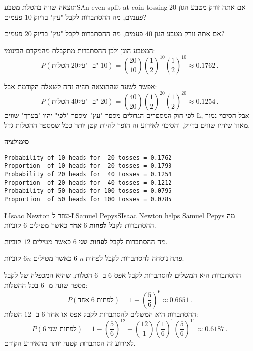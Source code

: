 
\begin{prob}{תוצאה שווה בהטלת מטבע}{S}{An even split at coin tossing}
אם אתה זורק מטבע הגון 
$20$
פעמים, מה ההסתברות לקבל "עץ" בדיוק 
$10$
פעמים?

אם אתה זורק מטבע הגון 
$40$
פעמים, מה ההסתברות לקבל "עץ" בדיוק 
$20$
פעמים?
\end{prob}

\solution{}

המטבע הוגן ולכן ההסתברות מתקבלת מהמקדם הבינומי:
\[
P(\textrm{הטלות}\; 20\textrm{ב- "עץ"}\;10)=
{20 \choose 10} \left(\frac{1}{2}\right)^{10}\left(\frac{1}{2}\right)^{10}\approx 0.1762\,.
\]

אפשר לשער שהתוצאה תהיה זהה לשאלה הקודמת אבל:
\[
P(\textrm{הטלות}\;40\textrm{ב- "עץ"}\;20)=
{40 \choose 20} \left(\frac{1}{2}\right)^{20}\left(\frac{1}{2}\right)^{20}\approx 0.1254\,.
\]
לפי חוק המספרים הגדולים מספר "עץ" ומספר "לפי" יהיו "בערך" שווים
\L{\cite[Section~8.4]{ross}},
אבל הסיכוי נמוך מאוד שיהיו שווים בדיוק, והסיכוי לאירוע זה הופך להיות קטן יותר ככל שמספר ההטלות גדל.

\textbf{סימולציה}
\begin{verbatim}
Probability of 10 heads for  20 tosses = 0.1762
Proportion  of 10 heads for  20 tosses = 0.1790
Probability of 20 heads for  40 tosses = 0.1254
Proportion  of 20 heads for  40 tosses = 0.1212
Probability of 50 heads for 100 tosses = 0.0796
Proportion  of 50 heads for 100 tosses = 0.0785
\end{verbatim}


\begin{prob}{\L{\small Isaac Newton} עוזר ל-\L{\small Samuel Pepys}}{S}{Isaac Newton helps Samuel Pepys}
מה ההסתברות לקבל
\textbf{לפחות}
$6$
\textbf{אחד}
כאשר מטילים 
$6$
קוביות.

מה ההסתברות לקבל
\textbf{לפחות שני}
$6$
כאשר מטילים 
$12$
קוביות.

פתח נוסחה להסתברות לקבל לפחות
$n$ $6$
כאשר מטילים 
$6n$
קוביות.
\end{prob}

\solution{}

ההסתברות היא המשלים להסתברות לקבל אפס 
$6$
ב-%
$6$
הטלות, שהיא המכפלה של לקבל מספר שונה מ-%
$6$
בכל ההטלות:
\[
P(\textrm{אחד} \; 6\; \textrm{לפחות})=1-\left(\frac{5}{6}\right)^6\approx 0.6651\,.
\]
ההסתברות היא המשלים להסתברות לקבל אפס או אחד
$6$
ב-%
$12$
הטלות:
\[
P(6\; \textrm{לפחות שני})=1-\left(\frac{5}{6}\right)^{12}-{12\choose 1}\left(\frac{1}{6}\right)^{1}\left(\frac{5}{6}\right)^{11}\approx 0.6187\,.
\]
לאירוע זה הסתברות קטנה יותר מהאירוע הקודם.


